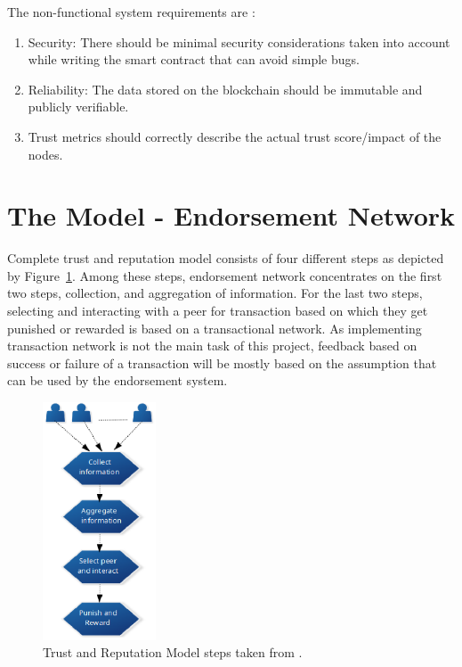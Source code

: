 The non-functional system requirements are : 
\begin{enumerate}
	\item Security: There should be minimal security considerations taken into
		account while writing the smart contract that can avoid simple bugs.  
	\item Reliability: The data stored on the blockchain should be immutable
		and publicly verifiable.
	\item Trust metrics should correctly describe the actual trust score/impact of the nodes.  
\end{enumerate}

\section{The Model - Endorsement Network}\label{sec:endorsementModel}
Complete trust and reputation model consists of four different steps as
depicted by Figure~\ref{fig:truststep}. Among these steps, endorsement network
concentrates on the first two steps, collection, and aggregation of
information. For the last two steps, selecting and interacting with a peer for
transaction based on which they get punished or rewarded is based on a
transactional network. As implementing transaction network is not the main task
of this project, feedback based on success or failure of a transaction will be
mostly  based on the assumption that can be used by the endorsement system.
\begin{figure}
	\begin{center}
		\includegraphics[width=0.3\textwidth]{Images/TrustReputationSteps.eps}
		\caption{Trust and Reputation Model steps taken from \cite{marmol2009security}.}
		\label{fig:truststep}
	\end{center}
\end{figure}


